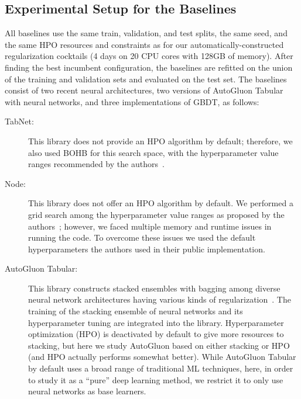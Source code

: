 \subsection{Experimental Setup for the Baselines}
\label{sec:baselines}

All baselines use the same train, validation, and test splits, the same seed, and the same HPO resources and constraints as for our automatically-constructed regularization cocktails (4 days on 20 CPU cores with 128GB of memory). After finding the best incumbent configuration, the baselines are refitted on the union of the training and validation sets and evaluated on the test set. The baselines consist of two recent neural architectures, two versions of AutoGluon Tabular with neural networks, and three implementations of GBDT, as follows:

\begin{description}

    \item[TabNet:] This library does not provide an HPO algorithm by default; therefore, we also used BOHB for this search space, with the hyperparameter value ranges recommended by the authors~\citep{49698}.
    \item[Node:] This library does not offer an HPO algorithm by default. We performed a grid search among the hyperparameter value ranges as proposed by the authors~\citep{Popov2020Neural}; however, we faced multiple memory and runtime issues in running the code. To overcome these issues we used the default hyperparameters the authors used in their public implementation.
    \item[AutoGluon Tabular:] This library constructs stacked ensembles with bagging among diverse neural network architectures having various kinds of regularization~\citep{DBLP:journals/corr/abs-2003-06505}. The training of the stacking ensemble of neural networks and its hyperparameter tuning are integrated into the library. Hyperparameter optimization (HPO) is deactivated by default to give more resources to stacking, but here we study AutoGluon based on either stacking or HPO (and HPO actually performs somewhat better). While AutoGluon Tabular by default uses a broad range of traditional ML techniques, here, in order to study it as a ``pure'' deep learning method, we restrict it to only use neural networks as base learners.


\end{description}
